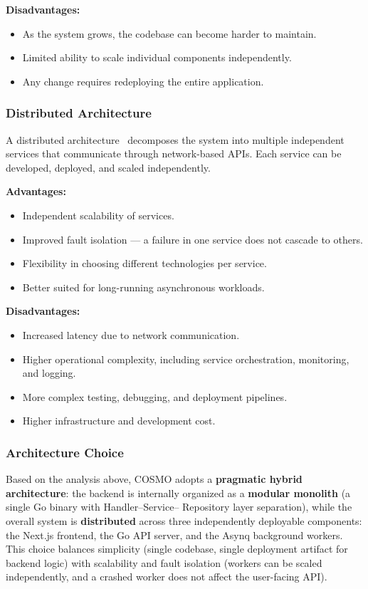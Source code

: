 \documentclass[a4paper]{article}
\begin{document}
\textbf{Disadvantages:}
\begin{itemize}
    \item As the system grows, the codebase can become harder to 
    maintain.
    \item Limited ability to scale individual components independently.
    \item Any change requires redeploying the entire application.
\end{itemize}

\subsubsection{Distributed Architecture}

A distributed architecture~\cite{richards2020fundamentals} decomposes 
the system into multiple independent services that communicate through 
network-based APIs. Each service can be developed, deployed, and 
scaled independently.

\textbf{Advantages:}
\begin{itemize}
    \item Independent scalability of services.
    \item Improved fault isolation --- a failure in one service does 
    not cascade to others.
    \item Flexibility in choosing different technologies per service.
    \item Better suited for long-running asynchronous workloads.
\end{itemize}

\textbf{Disadvantages:}
\begin{itemize}
    \item Increased latency due to network communication.
    \item Higher operational complexity, including service 
    orchestration, monitoring, and logging.
    \item More complex testing, debugging, and deployment pipelines.
    \item Higher infrastructure and development cost.
\end{itemize}

\subsubsection{Architecture Choice}

Based on the analysis above, COSMO adopts a \textbf{pragmatic hybrid 
architecture}: the backend is internally organized as a 
\textbf{modular monolith} (a single Go binary with Handler–Service–
Repository layer separation), while the overall system is 
\textbf{distributed} across three independently deployable components: 
the Next.js frontend, the Go API server, and the Asynq background 
workers. This choice balances simplicity (single codebase, single 
deployment artifact for backend logic) with scalability and fault 
isolation (workers can be scaled independently, and a crashed worker 
does not affect the user-facing API).
\end{document}

